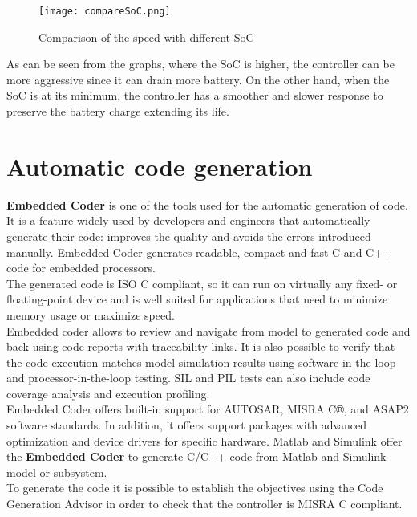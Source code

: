 \documentclass[12pt,a4paper]{report}
\begin{document}
\begin{figure}[htbp]
	\centering
	\texttt{[image: compareSoC.png]}
	\caption{Comparison of the speed with different SoC}
\end{figure}

As can be seen from the graphs, where the SoC is higher, the controller can be more aggressive since it can drain more battery. On the other hand, when the SoC is at its minimum, the controller has a smoother and slower response to preserve the battery charge extending its life.


\section{Automatic code generation}
\textbf{Embedded Coder} is one of the tools used for the automatic generation of code. It is a feature widely used by developers and engineers that automatically generate their code: improves the quality and avoids the errors introduced manually. 
Embedded Coder generates readable, compact and fast C and C++ code for embedded processors. \\
The generated code is ISO C compliant, so it can run on virtually any fixed- or floating-point device and is well suited for applications that need to minimize memory usage or maximize speed. \\
Embedded coder allows to review and navigate from model to generated code and back using code reports with traceability links. It is also possible to verify that the code execution matches model simulation results using software-in-the-loop and processor-in-the-loop testing. SIL and PIL tests can also include code coverage analysis and execution profiling. \\
Embedded Coder offers built-in support for AUTOSAR, MISRA C®, and ASAP2 software standards. In addition, it offers support packages with advanced optimization and device drivers for specific hardware.
Matlab and Simulink offer the \textbf{Embedded Coder} to generate C/C++ code from Matlab and Simulink model or subsystem. \\
To generate the code it is possible to establish the objectives using the Code Generation Advisor in order to check that the controller is MISRA C compliant.\\
\end{document}
